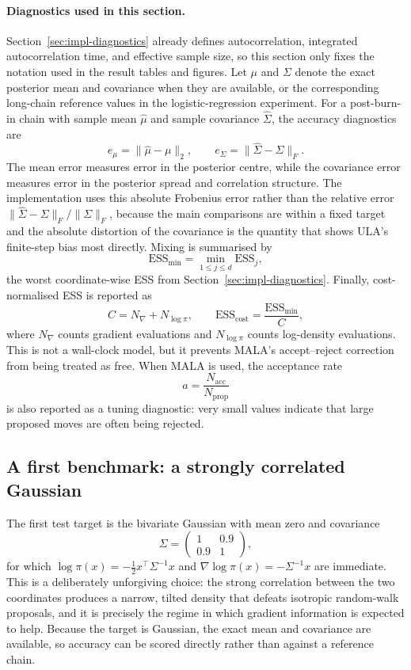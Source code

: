 \documentclass[a4paper,11pt, titlepage]{article}
\theoremstyle{definition}
\theoremstyle{plain}
\theoremstyle{remark}
\begin{document}
\paragraph{Diagnostics used in this section.}
Section~\ref{sec:impl-diagnostics} already defines autocorrelation,
integrated autocorrelation time, and effective sample size, so this
section only fixes the notation used in the result tables and figures.
Let $\mu$ and $\Sigma$ denote the exact posterior mean and covariance
when they are available, or the corresponding long-chain reference
values in the logistic-regression experiment. For a post-burn-in chain
with sample mean $\hat{\mu}$ and sample covariance $\hat{\Sigma}$, the
accuracy diagnostics are
\[
e_\mu = \|\hat{\mu}-\mu\|_2,
\qquad
e_\Sigma = \|\hat{\Sigma}-\Sigma\|_F .
\]
The mean error measures error in the posterior centre, while the
covariance error measures error in the posterior spread and correlation
structure. The implementation uses this absolute Frobenius error rather
than the relative error $\|\hat{\Sigma}-\Sigma\|_F/\|\Sigma\|_F$,
because the main comparisons are within a fixed target and the absolute
distortion of the covariance is the quantity that shows ULA's
finite-step bias most directly. Mixing is summarised by
\[
\mathrm{ESS}_{\min}=\min_{1\le j\le d}\mathrm{ESS}_j,
\]
the worst coordinate-wise ESS from Section~\ref{sec:impl-diagnostics}.
Finally, cost-normalised ESS is reported as
\[
C = N_{\nabla} + N_{\log\pi},
\qquad
\mathrm{ESS}_{\mathrm{cost}}=\frac{\mathrm{ESS}_{\min}}{C},
\]
where $N_{\nabla}$ counts gradient evaluations and $N_{\log\pi}$ counts
log-density evaluations. This is not a wall-clock model, but it prevents
MALA's accept--reject correction from being treated as free. When MALA
is used, the acceptance rate
\[
a = \frac{N_{\mathrm{acc}}}{N_{\mathrm{prop}}}
\]
is also reported as a tuning diagnostic: very small values indicate that
large proposed moves are often being rejected.

\subsection{A first benchmark: a strongly correlated Gaussian}
\label{sec:impl-gaussian}

The first test target is the bivariate Gaussian with mean zero and
covariance
\[
\Sigma = \begin{pmatrix} 1 & 0.9 \\ 0.9 & 1 \end{pmatrix},
\]
for which $\log\pi(x) = -\tfrac12 x^\top \Sigma^{-1} x$ and
$\nabla\log\pi(x) = -\Sigma^{-1}x$ are immediate. This is a deliberately
unforgiving choice: the strong correlation between the two coordinates
produces a narrow, tilted density that defeats isotropic random-walk
proposals, and it is precisely the regime in which gradient information
is expected to help. Because the target is Gaussian, the exact mean and
covariance are available, so accuracy can be scored directly rather than
against a reference chain.
\end{document}
